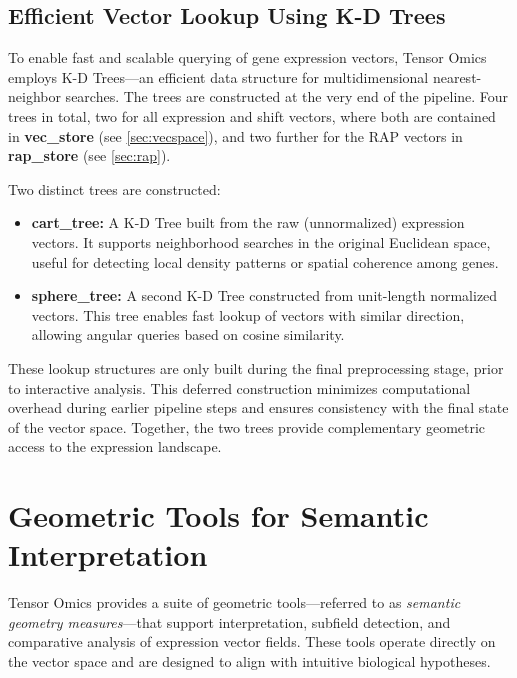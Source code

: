 \documentclass{article}
\begin{document}
\subsection{Efficient Vector Lookup Using K-D Trees}
\label{sec:kdtree}

To enable fast and scalable querying of gene expression vectors, Tensor Omics
employs K-D Trees—an efficient data structure for multidimensional
nearest-neighbor searches. The trees are constructed at the very end of the
pipeline. Four trees in total, two for all expression and shift vectors, where
both are contained in \textbf{vec\_store} (see \ref{sec:vecspace}), and two
further for the RAP vectors in \textbf{rap\_store} (see \ref{sec:rap}).

Two distinct trees are constructed:

\begin{itemize}
    \item \textbf{cart\_tree:} A K-D Tree built from the raw (unnormalized) expression vectors. It supports neighborhood searches in the original Euclidean space, useful for detecting local density patterns or spatial coherence among genes.
    
    \item \textbf{sphere\_tree:} A second K-D Tree constructed from unit-length normalized vectors. This tree enables fast lookup of vectors with similar direction, allowing angular queries based on cosine similarity.
\end{itemize}

These lookup structures are only built during the final preprocessing stage, prior to interactive analysis. This deferred construction minimizes computational overhead during earlier pipeline steps and ensures consistency with the final state of the vector space. Together, the two trees provide complementary geometric access to the expression landscape.

\section{Geometric Tools for Semantic Interpretation}
\label{sec:geometric_tools}

Tensor Omics provides a suite of geometric tools—referred to as \textit{semantic geometry measures}—that support interpretation, subfield detection, and comparative analysis of expression vector fields. These tools operate directly on the vector space and are designed to align with intuitive biological hypotheses.
\end{document}
